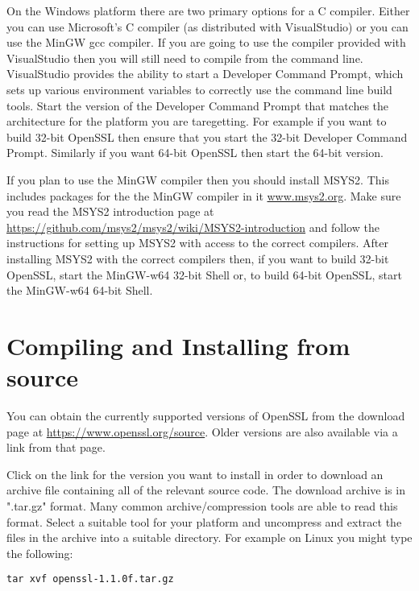 On the Windows platform there are two primary options for a C compiler. Either you can
use Microsoft's C compiler (as distributed with VisualStudio) or you can use the MinGW
gcc compiler. If you are going to use the compiler provided with VisualStudio then you
will still need to compile from the command line. VisualStudio provides the ability to
start a Developer Command Prompt, which sets up various environment variables to
correctly use the command line build tools. Start the version of the Developer
Command Prompt that matches the architecture for the platform you are taregetting. For
example if you want to build 32-bit OpenSSL then ensure that you start the 32-bit
Developer Command Prompt. Similarly if you want 64-bit OpenSSL then start the 64-bit
version.

If you plan to use the MinGW compiler then you should install MSYS2. This includes
packages for the the MinGW compiler in it \url{www.msys2.org}. Make sure you read the
MSYS2 introduction page at \url{https://github.com/msys2/msys2/wiki/MSYS2-introduction}
and follow the instructions for setting up MSYS2 with access to the correct compilers.
After installing MSYS2 with the correct compilers then, if you want to build 32-bit
OpenSSL, start the MinGW-w64 32-bit Shell or, to build 64-bit OpenSSL, start the
MinGW-w64 64-bit Shell.



\section{Compiling and Installing from source}

You can obtain the currently supported versions of OpenSSL from the download page at
\url{https://www.openssl.org/source}. Older versions are also available via a link
from that page.

Click on the link for the version you want to install in order to download an archive
file containing all of the relevant source code. The download archive is in ".tar.gz"
format. Many common archive/compression tools are able to read this format. Select a
suitable tool for your platform and uncompress and extract the files in the archive
into a suitable directory. For example on Linux you might type the following:

\begin{verbatim}
tar xvf openssl-1.1.0f.tar.gz
\end{verbatim}

